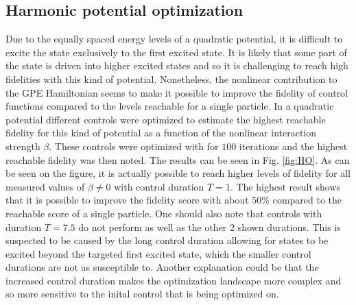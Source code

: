 \documentclass[a4paper, twocolumn]{revtex4-1}
\begin{document}
\subsection{Harmonic potential optimization}
Due to the equally spaced energy levels of a quadratic potential, it is difficult to excite the state exclusively to the first excited state. It is likely that some part of the state is driven into higher excited states and so it is challenging to reach high fidelities with this kind of potential. Nonetheless, the nonlinear contribution to the GPE Hamiltonian seems to make it possible to improve the fidelity of control functions compared to the levels reachable for a single particle. In a quadratic potential different controls were optimized to estimate the highest reachable fidelity for this kind of potential as a function of the nonlinear interaction strength $\beta$. These controls were optimized with  for $100$ iterations and the highest reachable fidelity was then noted. The results can be seen in Fig. \ref{fig:HO}. As can be seen on the figure, it is actually possible to reach higher levels of fidelity for all measured values of $\beta \neq 0$ with control duration $T = 1$. The highest result shows that it is possible to improve the fidelity score with about $50\%$ compared to the reachable score of a single particle. One should also note that controls with duration $T=7.5$ do not perform as well as the other 2 shown durations. This is suspected to be caused by the long control duration allowing for states to be excited beyond the targeted first excited state, which the smaller control durations are not as susceptible to. Another explanation could be that the increased control duration makes the optimization landscape more complex and so more sensitive to the inital control that is being optimized on.
\end{document}
